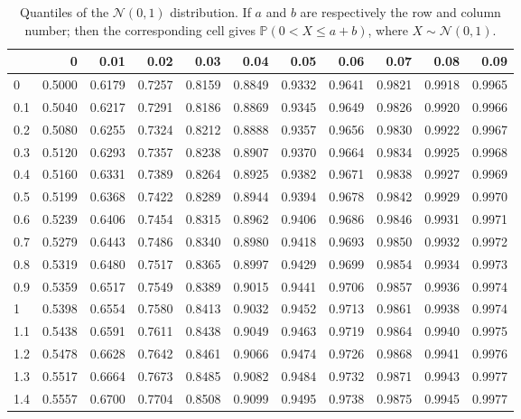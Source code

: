 \documentclass[
]{book}
\theoremstyle{definition}
\theoremstyle{definition}
\theoremstyle{definition}
\theoremstyle{definition}
\theoremstyle{remark}
\begin{document}
\begin{table}

\caption{\label{tab:Normal}Quantiles of the $\mathcal{N}(0,1)$ distribution. If $a$ and $b$ are respectively the row and column number; then the corresponding cell gives $\mathbb{P}(0<X\le a+b)$, where $X \sim \mathcal{N}(0,1)$.}
\centering
\begin{tabular}[t]{l|r|r|r|r|r|r|r|r|r|r}
\hline
  & 0 & 0.01 & 0.02 & 0.03 & 0.04 & 0.05 & 0.06 & 0.07 & 0.08 & 0.09\\
\hline
0 & 0.5000 & 0.6179 & 0.7257 & 0.8159 & 0.8849 & 0.9332 & 0.9641 & 0.9821 & 0.9918 & 0.9965\\
\hline
0.1 & 0.5040 & 0.6217 & 0.7291 & 0.8186 & 0.8869 & 0.9345 & 0.9649 & 0.9826 & 0.9920 & 0.9966\\
\hline
0.2 & 0.5080 & 0.6255 & 0.7324 & 0.8212 & 0.8888 & 0.9357 & 0.9656 & 0.9830 & 0.9922 & 0.9967\\
\hline
0.3 & 0.5120 & 0.6293 & 0.7357 & 0.8238 & 0.8907 & 0.9370 & 0.9664 & 0.9834 & 0.9925 & 0.9968\\
\hline
0.4 & 0.5160 & 0.6331 & 0.7389 & 0.8264 & 0.8925 & 0.9382 & 0.9671 & 0.9838 & 0.9927 & 0.9969\\
\hline
0.5 & 0.5199 & 0.6368 & 0.7422 & 0.8289 & 0.8944 & 0.9394 & 0.9678 & 0.9842 & 0.9929 & 0.9970\\
\hline
0.6 & 0.5239 & 0.6406 & 0.7454 & 0.8315 & 0.8962 & 0.9406 & 0.9686 & 0.9846 & 0.9931 & 0.9971\\
\hline
0.7 & 0.5279 & 0.6443 & 0.7486 & 0.8340 & 0.8980 & 0.9418 & 0.9693 & 0.9850 & 0.9932 & 0.9972\\
\hline
0.8 & 0.5319 & 0.6480 & 0.7517 & 0.8365 & 0.8997 & 0.9429 & 0.9699 & 0.9854 & 0.9934 & 0.9973\\
\hline
0.9 & 0.5359 & 0.6517 & 0.7549 & 0.8389 & 0.9015 & 0.9441 & 0.9706 & 0.9857 & 0.9936 & 0.9974\\
\hline
1 & 0.5398 & 0.6554 & 0.7580 & 0.8413 & 0.9032 & 0.9452 & 0.9713 & 0.9861 & 0.9938 & 0.9974\\
\hline
1.1 & 0.5438 & 0.6591 & 0.7611 & 0.8438 & 0.9049 & 0.9463 & 0.9719 & 0.9864 & 0.9940 & 0.9975\\
\hline
1.2 & 0.5478 & 0.6628 & 0.7642 & 0.8461 & 0.9066 & 0.9474 & 0.9726 & 0.9868 & 0.9941 & 0.9976\\
\hline
1.3 & 0.5517 & 0.6664 & 0.7673 & 0.8485 & 0.9082 & 0.9484 & 0.9732 & 0.9871 & 0.9943 & 0.9977\\
\hline
1.4 & 0.5557 & 0.6700 & 0.7704 & 0.8508 & 0.9099 & 0.9495 & 0.9738 & 0.9875 & 0.9945 & 0.9977\\

\end{tabular}
\end{table}
\end{document}
